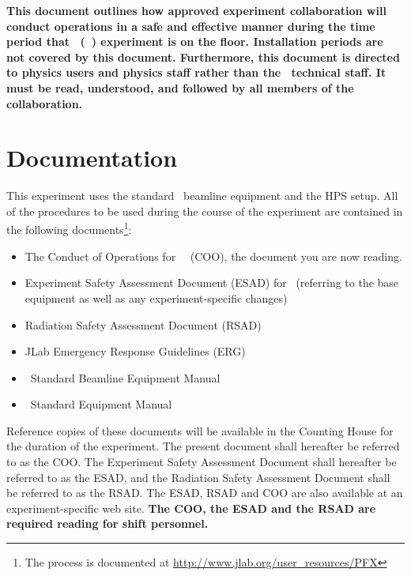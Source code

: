\documentclass[11pt]{article}
\begin{document}
{\bf This document outlines how approved experiment collaboration will conduct
operations in a safe and effective manner during the time period that 
\EXPTS\  (\EXPTSabrev\ ) experiment is on the floor. Installation 
periods are not covered by this document. 
Furthermore, this document is directed to physics users and
physics staff rather than the \HALL\ technical staff.  It must be read, 
understood, and followed by all members of the collaboration. }

\section{Documentation}

This experiment uses the standard \HALL\ beamline equipment and the HPS setup. 
All of the procedures to be used during the course of the experiment are contained in the following
documents\footnote{The process is documented at \url{http://www.jlab.org/user_resources/PFX} }:

\begin{itemize}

\item  The Conduct of Operations for \HALL\ \EXPTS\
 (COO), the document you are now reading. 

\item   Experiment Safety Assessment Document (ESAD)
for \EXPTS\ (referring to the base equipment as well as any 
experiment-specific changes)

\item Radiation Safety Assessment Document (RSAD) 

\item JLab Emergency Response Guidelines (ERG) 

\item \HALL\ Standard Beamline Equipment Manual 

\item \EXPTSabrev\ Standard Equipment Manual 

\end{itemize}


Reference copies of these documents will be available in the Counting 
House for the duration of the experiment. The present document shall 
hereafter be referred to as the COO. The Experiment Safety Assessment 
Document shall hereafter be referred to as the ESAD, and the
Radiation Safety Assessment Document shall be referred to as the RSAD.
The ESAD, RSAD and COO are also available at an experiment-specific 
web site. {\bf The COO, the ESAD and the RSAD are required reading for 
shift personnel.}
\end{document}

